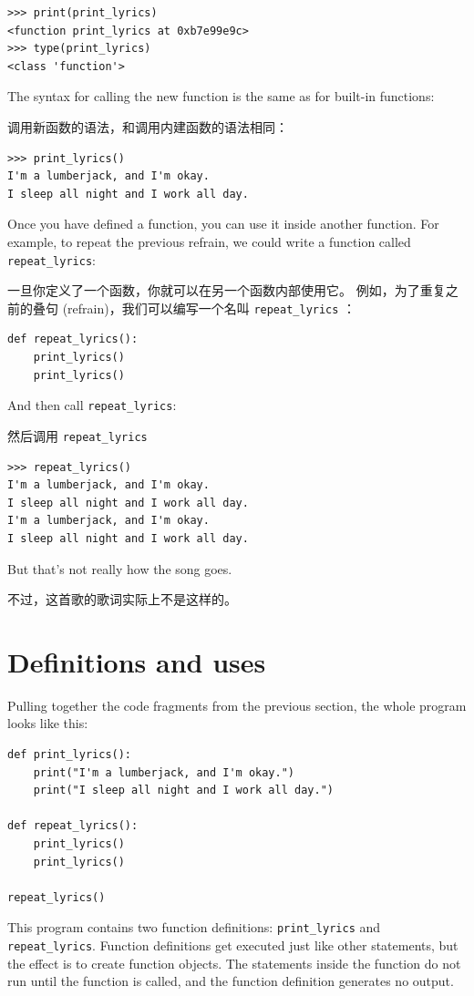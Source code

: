 \begin{lstlisting}
>>> print(print_lyrics)
<function print_lyrics at 0xb7e99e9c>
>>> type(print_lyrics)
<class 'function'>
\end{lstlisting}
%
The syntax for calling the new function is the same as
for built-in functions:

调用新函数的语法，和调用内建函数的语法相同：

\begin{lstlisting}
>>> print_lyrics()
I'm a lumberjack, and I'm okay.
I sleep all night and I work all day.
\end{lstlisting}
%
Once you have defined a function, you can use it inside another
function.  For example, to repeat the previous refrain, we could write
a function called \verb"repeat_lyrics":

一旦你定义了一个函数，你就可以在另一个函数内部使用它。
例如，为了重复之前的叠句 (refrain)，我们可以编写一个名叫 \lstinline{repeat_lyrics} ：


\begin{lstlisting}
def repeat_lyrics():
    print_lyrics()
    print_lyrics()
\end{lstlisting}
%
And then call \verb"repeat_lyrics":

然后调用 \lstinline{repeat_lyrics}


\begin{lstlisting}
>>> repeat_lyrics()
I'm a lumberjack, and I'm okay.
I sleep all night and I work all day.
I'm a lumberjack, and I'm okay.
I sleep all night and I work all day.
\end{lstlisting}
%
But that's not really how the song goes.

不过，这首歌的歌词实际上不是这样的。


%
\section{Definitions and uses}

Pulling together the code fragments from the previous section, the
whole program looks like this:

\begin{lstlisting}
def print_lyrics():
    print("I'm a lumberjack, and I'm okay.")
    print("I sleep all night and I work all day.")

def repeat_lyrics():
    print_lyrics()
    print_lyrics()

repeat_lyrics()
\end{lstlisting}
%
This program contains two function definitions: \verb"print_lyrics" and
\verb"repeat_lyrics".  Function definitions get executed just like other
statements, but the effect is to create function objects.  The statements
inside the function do not run until the function is called, and
the function definition generates no output.


